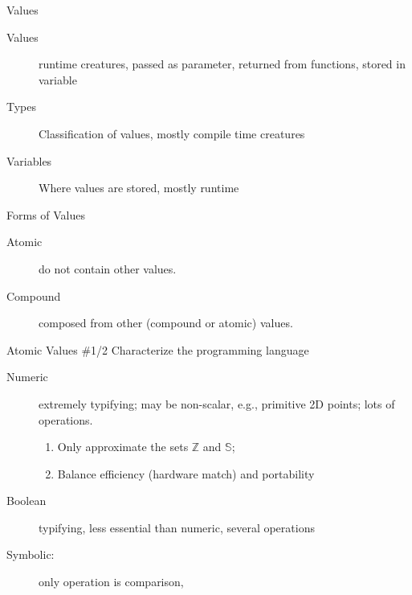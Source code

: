 \documentclass[aspectratio=169]{beamer}
\begin{document}
\begin{frame}{Values}
\begin{description}
    \item [Values] runtime creatures, passed as parameter, returned from functions, stored in variable
    \item [Types] Classification of values, mostly compile time creatures 
    \item [Variables] Where values are stored, mostly runtime 
\end{description}
\end{frame}

\begin{frame}{Forms of Values}
\begin{description}
    \item [Atomic] do not contain other values. 
    \item [Compound] composed from other (compound or atomic) values.
\end{description}
\end{frame}

\begin{frame}[fragile]{Atomic Values \#1/2}
Characterize the programming language
\begin{description}
\item [Numeric] extremely typifying; may be non-scalar, e.g., primitive 2D points; lots of operations.  
    \begin{enumerate}
        \item Only approximate the sets $\mathbb Z$ and $\mathbb S$; 
        \item Balance efficiency (hardware match) and portability
    \end{enumerate}
\item [Boolean] typifying, less essential than numeric, several operations
\item [Symbolic:] only operation is comparison, 
\end{description}
\end{frame}
\end{document}
